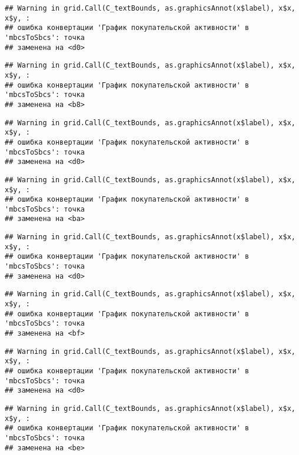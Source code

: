 \documentclass[
]{article}
\begin{document}
\begin{verbatim}
## Warning in grid.Call(C_textBounds, as.graphicsAnnot(x$label), x$x, x$y, :
## ошибка конвертации 'График покупательской активности' в 'mbcsToSbcs': точка
## заменена на <d0>
\end{verbatim}

\begin{verbatim}
## Warning in grid.Call(C_textBounds, as.graphicsAnnot(x$label), x$x, x$y, :
## ошибка конвертации 'График покупательской активности' в 'mbcsToSbcs': точка
## заменена на <b8>
\end{verbatim}

\begin{verbatim}
## Warning in grid.Call(C_textBounds, as.graphicsAnnot(x$label), x$x, x$y, :
## ошибка конвертации 'График покупательской активности' в 'mbcsToSbcs': точка
## заменена на <d0>
\end{verbatim}

\begin{verbatim}
## Warning in grid.Call(C_textBounds, as.graphicsAnnot(x$label), x$x, x$y, :
## ошибка конвертации 'График покупательской активности' в 'mbcsToSbcs': точка
## заменена на <ba>
\end{verbatim}

\begin{verbatim}
## Warning in grid.Call(C_textBounds, as.graphicsAnnot(x$label), x$x, x$y, :
## ошибка конвертации 'График покупательской активности' в 'mbcsToSbcs': точка
## заменена на <d0>
\end{verbatim}

\begin{verbatim}
## Warning in grid.Call(C_textBounds, as.graphicsAnnot(x$label), x$x, x$y, :
## ошибка конвертации 'График покупательской активности' в 'mbcsToSbcs': точка
## заменена на <bf>
\end{verbatim}

\begin{verbatim}
## Warning in grid.Call(C_textBounds, as.graphicsAnnot(x$label), x$x, x$y, :
## ошибка конвертации 'График покупательской активности' в 'mbcsToSbcs': точка
## заменена на <d0>
\end{verbatim}

\begin{verbatim}
## Warning in grid.Call(C_textBounds, as.graphicsAnnot(x$label), x$x, x$y, :
## ошибка конвертации 'График покупательской активности' в 'mbcsToSbcs': точка
## заменена на <be>
\end{verbatim}
\end{document}
